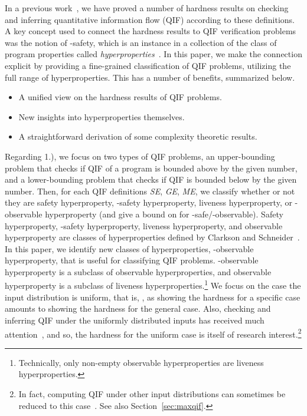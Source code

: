 \documentclass[]{eptcs}
\begin{document}
In a previous
work~\cite{DBLP:conf/csfw/YasuokaT10,DBLP:conf/esorics/YasuokaT10}, we
have proved a number of hardness results on checking and inferring
quantitative information flow (QIF) according to these definitions.  A
key concept used to connect the hardness results to QIF verification
problems was the notion of -safety, which is an instance in a
collection of the class of program properties called {\em
  hyperproperties}~\cite{DBLP:journals/jcs/ClarksonS10}.  In this paper,
we make the connection explicit by providing a fine-grained
classification of QIF problems, utilizing the full range of
hyperproperties.  This has a number of benefits, summarized below.
\begin{itemize}
\item[1.)] A unified view on the hardness results of QIF problems.
\item[2.)] New insights into hyperproperties themselves.
\item[3.)] A straightforward derivation of some complexity theoretic results.
\end{itemize}
Regarding 1.), we focus on two types of QIF problems, an
upper-bounding problem that checks if QIF of a program is bounded
above by the given number, and a lower-bounding problem that checks if
QIF is bounded below by the given number.  Then, for each QIF
definitions {\it SE}, {\it GE}, {\it ME}, we classify whether or not
they are safety hyperproperty, -safety hyperproperty, liveness
hyperproperty, or -observable hyperproperty (and give a bound on
 for -safe/-observable).  Safety hyperproperty, -safety
hyperproperty, liveness hyperproperty, and observable hyperproperty
are classes of hyperproperties defined by Clarkson and
Schneider~\cite{DBLP:journals/jcs/ClarksonS10}.  In this paper, we
identify new classes of hyperproperties, -observable hyperproperty,
that is useful for classifying QIF problems.  -observable
hyperproperty is a subclass of observable hyperproperties, and
observable hyperproperty is a subclass of liveness
hyperproperties.\footnote{Technically, only non-empty observable
  hyperproperties are liveness hyperproperties.}  We focus on the case
the input distribution is uniform, that is, , as showing the
hardness for a specific case amounts to showing the hardness for the
general case.  Also, checking and inferring QIF under the
uniformly distributed inputs has received much
attention~\cite{DBLP:conf/ifip1-7/HeusserM09,DBLP:conf/sp/BackesKR09,DBLP:conf/csfw/KopfR10,clark05,malacaria:popl2007,clarkjcs2007},
and so, the hardness for the uniform case is itself of research
interest.\footnote{In fact, computing QIF under other input
  distributions can sometimes be reduced to this
  case~\cite{DBLP:conf/ccs/SamaratiV10}.  See also Section~\ref{sec:maxqif}.}
\end{document}
